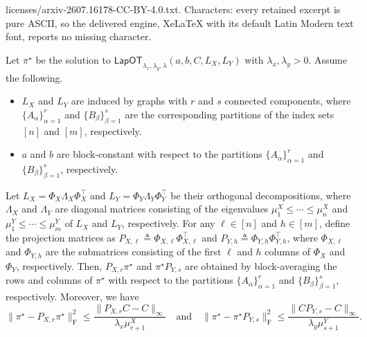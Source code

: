 \documentclass[10pt,a4paper]{amsart}
\begin{document}
licenses/arxiv-2607.16178-CC-BY-4.0.txt. Characters: every retained excerpt is pure ASCII, so the delivered engine, XeLaTeX with its default Latin Modern text font, reports no missing character.
\begin{theorem}
    \label{thm:optimal_coupling_projection_bound}
    Let $\pi^\star$ be the solution to $\mathsf{LapOT}_{\lambda_x, \lambda_y, \lambda}(a, b, C, L_X, L_Y)$ with $\lambda_x, \lambda_y > 0$. Assume the following.
    \begin{itemize}
        \item[(i)] $L_X$ and $L_Y$ are induced by graphs with $r$ and $s$ connected components, where $\{A_\alpha\}_{\alpha = 1}^{r}$ and $\{B_\beta\}_{\beta = 1}^{s}$ are the corresponding partitions of the index sets $[n]$ and $[m]$, respectively.
        \item[(ii)] $a$ and $b$ are block-constant with respect to the partitions $\{A_\alpha\}_{\alpha = 1}^{r}$ and $\{B_\beta\}_{\beta = 1}^{s}$, respectively.
    \end{itemize}
    Let $L_X = \Phi_X \Lambda_X \Phi_X^\top$ and $L_Y = \Phi_Y \Lambda_Y \Phi_Y^\top$ be their orthogonal decompositions, where $\Lambda_X$ and $\Lambda_Y$ are diagonal matrices consisting of the eigenvalues $\mu_1^X \le \cdots \le \mu_n^X$ and $\mu_1^Y \le \cdots \le \mu_m^Y$ of $L_X$ and $L_Y$, respectively. For any $\ell \in [n]$ and $h \in [m]$, define the projection matrices as $P_{X, \ell} \triangleq \Phi_{X, \ell} \Phi_{X, \ell}^\top$ and $P_{Y, h} \triangleq \Phi_{Y, h} \Phi_{Y, h}^\top$, where $\Phi_{X, \ell}$ and $\Phi_{Y, h}$ are the submatrices consisting of the first $\ell$ and $h$ columns of $\Phi_X$ and $\Phi_Y$, respectively. Then, $P_{X, r} \pi^\star$ and $\pi^\star P_{Y, s}$ are obtained by block-averaging the rows and columns of $\pi^\star$ with respect to the partitions $\{A_\alpha\}_{\alpha = 1}^{r}$ and $\{B_\beta\}_{\beta = 1}^{s}$, respectively. Moreover, we have
    \begin{equation}
        \label{eq:optimal_coupling_projection_bound}
        \|\pi^\star - P_{X, r} \pi^\star\|_{\mathrm{F}}^2 \le \frac{\|P_{X, r} C - C\|_\infty}{\lambda_x \mu_{r + 1}^X} \quad \text{and} \quad \|\pi^\star - \pi^\star P_{Y, s}\|_{\mathrm{F}}^2 \le \frac{\|C P_{Y, s} - C\|_\infty}{\lambda_y \mu_{s + 1}^Y}.
    \end{equation}
\end{theorem}
\end{document}
